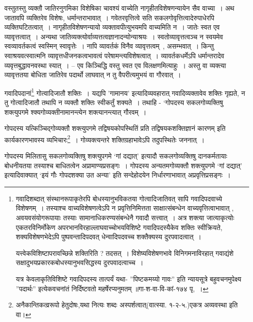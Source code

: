 \begin{small}
				वस्तुतस्तु व्यक्तौ जातिरनुगमिका विशेषिका चावश्यं वाच्येति नागृहीतविशेषणन्यायेन सैव वाच्या~। अथ जातावपि व्यक्तिरेव विशेषः, धर्मान्तराभावात्~। गवेतरवृत्तित्वे सति सकलगोवृत्तित्वादेरुपाधेरपि व्यक्तिघटितत्वात्~। नागृहीतविशेषणन्यायो व्यक्तावपीत्युभयमपि वाच्यमिति न~। जातेः स्वत एव व्यावृत्तत्वात्~। अन्यथा जातिव्यक्त्योर्वाव्यत्तत्वज्ञानादन्योन्याश्रयः~। स्वतोव्यावृत्तत्वञ्च न स्वयमेव स्वव्यावर्तकत्वं स्वस्मिन् स्वावृत्तेः~। नापि व्यावर्तकं विनैव व्यावृत्तत्वम्~, असम्भवात्~। किन्तु स्वाश्रयवत्स्वात्मनि व्यावृत्तधीजनकत्वभावत्वं परेषामन्त्यविशेषत्वात्~। व्यावर्तकधर्मेऽपि धर्मान्तरादेव व्यवृत्तबुद्धावनवस्था स्यात्~। -- एव किञ्चिद्धि वस्तु स्वत एव विलक्षणमित्याहुः~। अस्तु वा व्यक्त्या व्यावृत्ततया बोधिता जातिरेव पदार्थो लाघवात् न तु वैपरीत्यमुभयं वा गौरवात्~। 
			\end{small}

			गवादिपदानां\footnote{गवादिशब्दात् संस्थानरूपाकृतेरपि  बोधस्यानुभविकतया गोत्वादिजातिवत् सापि गवादिपदवाच्ये विशेषणम्~। तस्याश्च  वाच्यविशेषणत्वेऽपि न प्रवृत्तिनिमित्तता साक्षात्संबन्धेन  वाच्यवृत्तित्वाभावात् , अवयवसंयोगरूपायाः  तस्याः सामानाधिकरण्यसंबन्धेनै  गवादौ सत्त्वात्~।  अत्र शक्त्या जात्याकृत्योः एकतरविनिर्मोकेण  अपरभानविरहाल्लाघवाच्चोभयविशिष्टे  गवादिपदस्यैकेव शक्तिः  स्वीक्रियते, शक्यविशेषणभेदेऽपि पुष्पवन्तादिपदवत्  धेन्वादिपदवच्च  शक्तैक्यस्य  दुरपवादत्वात्~।
			
			यत्त्वेकविशिष्टापरावच्छिन्ने  शक्तिरिति ? तदसत्~। विशेष्यविशेषणभावे विनिगमनाविरहात्  गवाद्यंशे सक्षादुभयप्रकारकबोधस्यानुभवसिद्धस्य  दुरपवादत्वाच्च~।

			यत्र केवलाकृतिविशिष्टे  गवादिपदस्य  तात्पर्यं यथा- ”पिष्टकमय्यो गावः” इति न्यायसूत्रे बहुवचनमुपेक्ष्य  ”पदार्थः” इत्येकवचनांतं निर्दिष्टवतो महर्षेरप्यनुमतम् ॥गा-श-वा-वि-कां-१७४ पृ,~।} गोत्वादिजातौ शक्तिः~। यद्यपि 'गामानय' इत्यादिव्यवहारात् गवादिव्यक्तावेव शक्तिः गृह्यते, न तु गोत्वादिजातौ तथापि न व्यक्तौ शक्तिः स्वीकर्तुं शक्यते~। तथाहि - ‘गोपदस्य सकलगोव्यक्तिषु  शक्त्युपगमे श्क्यगोव्यक्तीनामानन्त्येन शक्त्यानन्त्यात् गौरवम्~।

			गोपदस्य यत्किञ्चिद्गोव्यक्तौ शक्त्युपगमे तद्विषयकोपस्थितिं प्रति तद्विषयकशक्तिज्ञानं कारणम् इति  कार्यकारणभावस्य व्यभिचारः\footnote{अनैकान्तिकत्व्ररूपो हेतुदोषः,यथा नित्यः शब्दः अस्पर्शत्वात्(वात्स्या. १-२-५.)एकत्र अव्यवस्था इति वा।}~। गोव्यक्त्यन्तरे शक्तिग्रहाभावेऽपि तदुपस्थितेः जननात्~।

			गोपदस्य मिलितासु सकलगोव्यक्तिषु शक्त्युपगमे ‘गां दद्यात्' इत्यादौ सकलगोव्यक्तिषु दानकर्मतायाः बोधनीयतया तस्याश्च बाधितत्वेन अप्रामाण्यप्रसङ्गः~।	गोपदस्य अन्यतमगोव्यक्तौ शक्त्युपगमे ‘गां दद्यात्' इत्यादिवाक्यात् ‘इयं गौः गोपदशक्या उत अन्या' इति सन्देहोदयेन निर्धारणाभावात्  अप्रवृत्तिप्रसङ्गः~।
	
